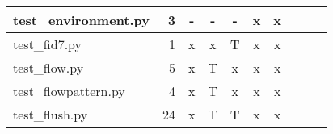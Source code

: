 \documentclass[12pt,a4paper]{report}
\begin{document}
\begin{table}
\begin{tabular}[t]{|l|r|c|c|c|c|c|c|c|c|}
test\_environment.py                            &  3                  &   -        &   -             &   -           &   x              &   x                 \\ \hline
test\_fid7.py                                   &  1                  &   x        &   x             &   T           &   x              &   x                 \\ \hline
test\_flow.py                                   &  5                  &   x        &   T             &   x           &   x              &   x                 \\ \hline
test\_flowpattern.py                            &  4                  &   x        &   T             &   x           &   x              &   x                 \\ \hline
test\_flush.py                                  &  24                 &   x        &   T             &   T           &   x              &   x                 \\ \hline
\end{tabular}
\end{table}
\end{document}
